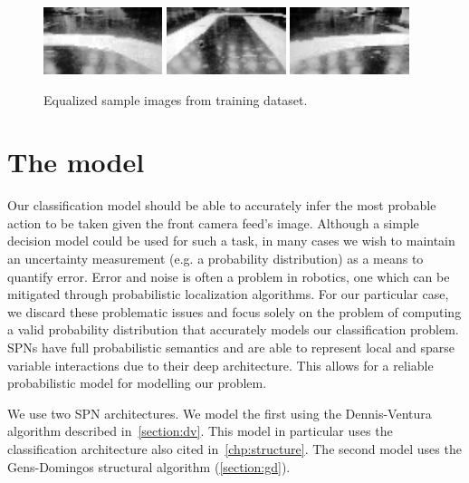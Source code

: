 \begin{figure}[h]
  \centering\includegraphics[width=0.31\textwidth]{imgs/eq_left.png}
  \includegraphics[width=0.31\textwidth]{imgs/eq_up.png}
  \includegraphics[width=0.31\textwidth]{imgs/eq_right.png}
  \caption{Equalized sample images from training dataset.\label{fig:dataset_equalized}}
\end{figure}

\section{The model}

Our classification model should be able to accurately infer the most probable action to be taken
given the front camera feed's image. Although a simple decision model could be used for such a
task, in many cases we wish to maintain an uncertainty measurement (e.g. a probability
distribution) as a means to quantify error. Error and noise is often a problem in robotics, one
which can be mitigated through probabilistic localization algorithms. For our particular case, we
discard these problematic issues and focus solely on the problem of computing a valid probability
distribution that accurately models our classification problem. SPNs have full probabilistic
semantics and are able to represent local and sparse variable interactions due to their deep
architecture. This allows for a reliable probabilistic model for modelling our problem.

We use two SPN architectures. We model the first using the Dennis-Ventura algorithm described
in~\autoref{section:dv}. This model in particular uses the classification architecture also cited
in~\autoref{chp:structure}. The second model uses the Gens-Domingos structural algorithm
(\autoref{section:gd}).

